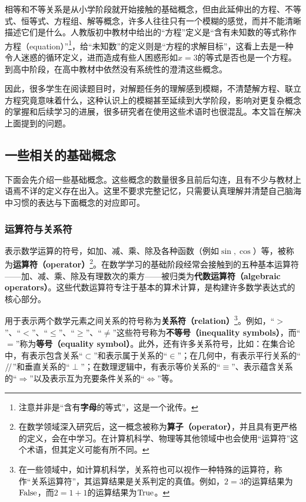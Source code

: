 

相等和不等关系是从小学阶段就开始接触的基础概念，但由此延伸出的方程、不等式、恒等式、方程组、解等概念，许多人往往只有一个模糊的感觉，而并不能清晰描述它们是什么。人教版初中教材中给出的“方程”定义是“含有未知数的等式称作方程（equation）”\footnote{注意并非是“含有\textbf{字母}的等式”，这是一个讹传。}，给“未知数”的定义则是“方程的求解目标”，这看上去是一种令人迷惑的循环定义，进而造成有些人困惑形如$x=3$的等式是否也是一个方程。到高中阶段，在高中教材中依然没有系统性的澄清这些概念。

因此，很多学生在阅读题目时，对解题任务的理解感到模糊，不清楚解方程、联立方程究竟意味着什么，这种认识上的模糊甚至延续到大学阶段，影响对更复杂概念的掌握和后续学习的进展，很多研究者在使用这些术语时也很混乱。本文旨在解决上面提到的问题。

\subsection{一些相关的基础概念}

下面会先介绍一些基础概念。这些概念的数量很多且前后勾连，且有不少与教材上语焉不详的定义存在出入。这里不要求完整记忆，只需要认真理解并清楚自己脑海中习惯的表达与下面概念的对应即可。

\subsubsection{运算符与关系符}

表示数学运算的符号，如加、减、乘、除及各种函数（例如$\sin,\cos$）等，被称为\textbf{运算符（operator）}\footnote{在数学领域深入研究后，这一概念被称为\textbf{算子（operator）}，并且具有更严格的定义，会在中学习。在计算机科学、物理等其他领域中也会使用“运算符”这个术语，但其定义可能有所不同。}。在数学学习的基础阶段经常会接触到的五种基本运算符——加、减、乘、除及有理数次的乘方——被归类为\textbf{代数运算符（algebraic operators）}。这些代数运算符专注于基本的算术计算，是构建许多数学表达式的核心部分。

用于表示两个数学元素之间关系的符号称为\textbf{关系符（relation）}\footnote{在一些领域中，如计算机科学，关系符也可以视作一种特殊的运算符，称作“关系运算符”，其运算结果是关系判定的真值。例如，$2=3$的运算结果为$\rm False$，而$2=1+1$的运算结果为$\rm True$。}。例如，“$>$”、“$<$”、“$\leq$”、“$\geq$”、“$\neq$”这些符号称为\textbf{不等号（inequality symbols）}，而“$=$”称为\textbf{等号（equality symbol）}。此外，还有许多关系符号，比如：在集合论中，有表示包含关系“$\subset$”和表示属于关系的“$\in$”；在几何中，有表示平行关系的“$\mathrel{/\mskip-2.5mu/}$”和垂直关系的“$\perp$”；在数理逻辑中，有表示等价关系的“$\equiv$”、表示蕴含关系的“$\Rightarrow$”以及表示互为充要条件关系的“$\iff$”等。

